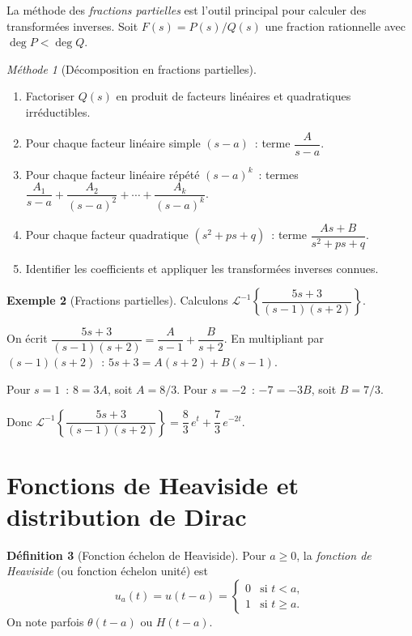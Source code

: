 \documentclass[12pt,a4paper,openany]{book}
\theoremstyle{definition}
\newtheorem{definition}{Définition}[chapter]
\newtheorem{exemple}[definition]{Exemple}
\theoremstyle{plain}
\theoremstyle{remark}
\newtheorem{methode}[definition]{Méthode}
\begin{document}
La méthode des \emph{fractions partielles}
est l'outil principal pour calculer des transformées inverses. Soit
$F(s)=P(s)/Q(s)$ une fraction rationnelle avec $\deg P<\deg Q$.

\begin{methode}[Décomposition en fractions partielles]\label{meth:frac-part}
  \begin{enumerate}[label=\textbf{(\arabic*)}]
    \item Factoriser $Q(s)$ en produit de facteurs linéaires et
      quadratiques irréductibles.
    \item Pour chaque facteur linéaire simple $(s-a)$~: terme
      $\dfrac{A}{s-a}$.
    \item Pour chaque facteur linéaire répété $(s-a)^k$~: termes
      $\dfrac{A_1}{s-a}+\dfrac{A_2}{(s-a)^2}+\cdots+\dfrac{A_k}{(s-a)^k}$.
    \item Pour chaque facteur quadratique $(s^2+ps+q)$~: terme
      $\dfrac{As+B}{s^2+ps+q}$.
    \item Identifier les coefficients et appliquer les transformées
      inverses connues.
  \end{enumerate}
\end{methode}

\begin{exemple}[Fractions partielles]\label{ex:frac-part-1}
  Calculons $\mathcal{L}^{-1}\!\left\{\dfrac{5s+3}{(s-1)(s+2)}\right\}$.

  On écrit $\dfrac{5s+3}{(s-1)(s+2)}=\dfrac{A}{s-1}+\dfrac{B}{s+2}$.
  En multipliant par $(s-1)(s+2)$~: $5s+3=A(s+2)+B(s-1)$.

  Pour $s=1$~: $8=3A$, soit $A=8/3$.
  Pour $s=-2$~: $-7=-3B$, soit $B=7/3$.

  Donc
  $\mathcal{L}^{-1}\!\left\{\dfrac{5s+3}{(s-1)(s+2)}\right\}
  = \dfrac{8}{3}\,e^{t}+\dfrac{7}{3}\,e^{-2t}$.
\end{exemple}

\section{Fonctions de Heaviside et distribution de Dirac}\label{sec:heaviside-dirac}

\begin{definition}[Fonction échelon de Heaviside]\label{def:heaviside}
  Pour $a\geq 0$, la \emph{fonction de Heaviside} (ou fonction
  échelon unité) est
  \[
    u_a(t) = u(t-a) =
    \begin{cases}
      0 & \text{si } t<a, \\
      1 & \text{si } t\geq a.
    \end{cases}
  \]
  On note parfois $\theta(t-a)$ ou $H(t-a)$.
\end{definition}
\end{document}
